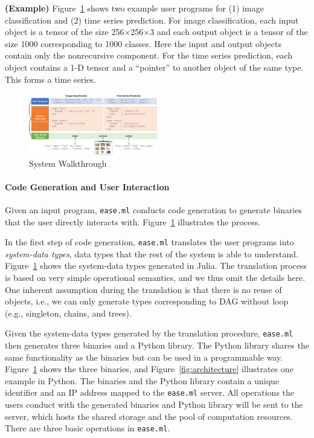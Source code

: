 \documentclass[letterpaper]{vldb}
\newcommand{\eml}{\texttt{ease.ml}\xspace}
\begin{document}
\vspace{0.5em}
\noindent
{\bf (Example)} Figure~\ref{fig:walkthrough} shows
two example user programs for (1) image classification and (2) time series
prediction. For image classification, each input
object is a tensor of the size 256$\times$256$\times$3 and
each output object is a tensor of the size 1000 corresponding
to 1000 classes. Here the input
and output objects contain only the nonrecursive component.
For the time series prediction, each object 
contains a 1-D tensor and 
a ``pointer'' to another object of the same type. This
forms a time series. 


\begin{figure}[t]
\centering
\includegraphics[width=0.5\textwidth]{figures/arch}
\vspace{-2em}
\caption{System Walkthrough}
\vspace{-2em}
\label{fig:walkthrough}
\end{figure}


\vspace{-2em}
\paragraph*{Code Generation and User Interaction}

Given an input program, \eml conducts code generation
to generate binaries that the user directly interacts with.
Figure~\ref{fig:walkthrough} illustrates the process.

In the first step of code generation, \eml translates
the user programs into {\em system-data types}, data types
that the rest of the system is able to understand. 
Figure~\ref{fig:walkthrough} shows the system-data types
generated in Julia. The translation process is based
on very simple operational semantics, and we thus omit the details
here. One inherent assumption during the translation
is that there is no reuse of objects, i.e., we can 
only generate types corresponding to DAG without loop
(e.g., singleton, chains, and trees). 

Given the system-data types generated by the translation
procedure, \eml then generates three binaries and
a Python library.
The Python library shares the same functionality as
the binaries but can be used in a programmable way.
Figure~\ref{fig:walkthrough} shows the three binaries,
and Figure~\ref{fig:architecture} illustrates one
example in Python. The binaries and the Python library
contain a unique identifier and an IP address mapped to the
\eml server. All operations the users conduct with
the generated binaries and Python library will be 
sent to the server, which hosts the shared
storage and the pool of computation resources.
There are three basic operations in \eml.
\end{document}
